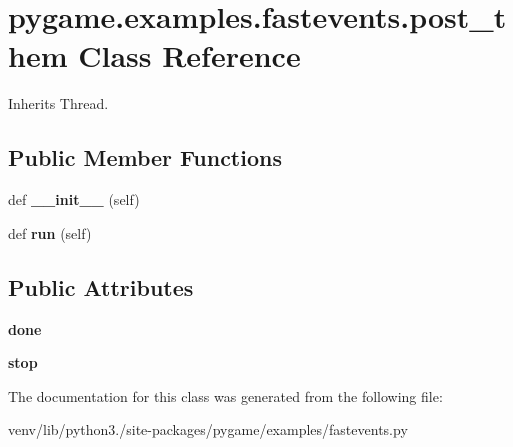\hypertarget{classpygame_1_1examples_1_1fastevents_1_1post__them}{}\section{pygame.\+examples.\+fastevents.\+post\+\_\+them Class Reference}
\label{classpygame_1_1examples_1_1fastevents_1_1post__them}


Inherits Thread.

\subsection*{Public Member Functions}
\begin{DoxyCompactItemize}
\item 
\mbox{\label{classpygame_1_1examples_1_1fastevents_1_1post__them_a73d2b1b70222c1159b5846ef63013b40}} 
def {\bfseries \+\_\+\+\_\+init\+\_\+\+\_\+} (self)
\item 
\mbox{\label{classpygame_1_1examples_1_1fastevents_1_1post__them_a940908ae35bda9a41a3301a048ac17ce}} 
def {\bfseries run} (self)
\end{DoxyCompactItemize}
\subsection*{Public Attributes}
\begin{DoxyCompactItemize}
\item 
\mbox{\label{classpygame_1_1examples_1_1fastevents_1_1post__them_aaa864bdfed1de307ba652b5ea7610e73}} 
{\bfseries done}
\item 
\mbox{\label{classpygame_1_1examples_1_1fastevents_1_1post__them_a2334703c6b8fcd3a9cc6ad23dd085d36}} 
{\bfseries stop}
\end{DoxyCompactItemize}


The documentation for this class was generated from the following file\+:\begin{DoxyCompactItemize}
\item 
venv/lib/python3./site-\/packages/pygame/examples/fastevents.\+py\end{DoxyCompactItemize}
